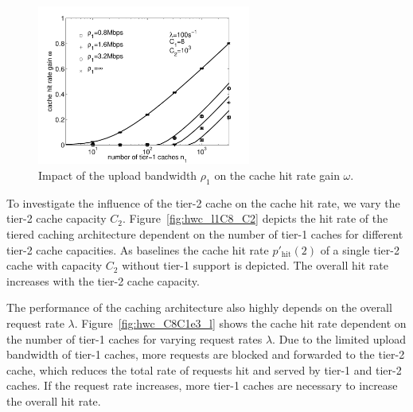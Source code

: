 
\begin{figure}[tb]
  \vspace{-0.25cm}
\centering
\includegraphics[width=70mm]{hierarchical/analyticbw/figures/hwc_C8l100_gain}
\caption{Impact of the upload bandwidth $\rho_1$ on the cache hit rate gain $\omega$.}
\label{fig:hwc_C8l100_gain}

\end{figure}

To investigate the influence of the tier-2 cache on the cache hit rate, we vary the tier-2 cache capacity $C_2$.
Figure~\ref{fig:hwc_l1C8_C2} depicts the hit rate of the tiered caching architecture dependent on the number of tier-1 caches for different tier-2 cache capacities.
As baselines the cache hit rate $p'_\text{hit}(2)$ of a single tier-2 cache with capacity $C_2$ without tier-1 support is depicted.
The overall hit rate increases with the tier-2 cache capacity.

The performance of the caching architecture also highly depends on the overall request rate $\lambda$.
Figure~\ref{fig:hwc_C8C1e3_l} shows the cache hit rate dependent on the number of tier-1 caches for varying request rates $\lambda$.
Due to the limited upload bandwidth of tier-1 caches, more requests are blocked and forwarded to the tier-2 cache, which reduces the total rate of requests hit and served by tier-1 and tier-2 caches.
If the request rate increases, more tier-1 caches are necessary to increase the overall hit rate.

